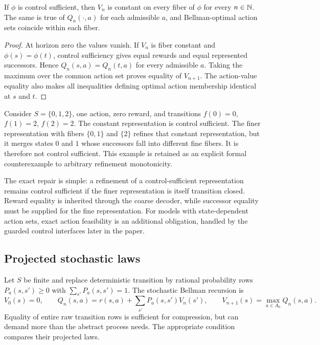 \begin{theorem}
If $\phi$ is control sufficient, then $V_n$ is constant on every fiber of $\phi$ for every $n\in\mathbb N$. The same is true of $Q_n(\cdot,a)$ for each admissible $a$, and Bellman-optimal action sets coincide within each fiber.
\end{theorem}
\begin{proof}
At horizon zero the values vanish. If $V_n$ is fiber constant and $\phi(s)=\phi(t)$, control sufficiency gives equal rewards and equal represented successors. Hence $Q_n(s,a)=Q_n(t,a)$ for every admissible $a$. Taking the maximum over the common action set proves equality of $V_{n+1}$. The action-value equality also makes all inequalities defining optimal action membership identical at $s$ and $t$.
\end{proof}

\begin{example}
Consider $S=\{0,1,2\}$, one action, zero reward, and transitions $f(0)=0$, $f(1)=2$, $f(2)=2$. The constant representation is control sufficient. The finer representation with fibers $\{0,1\}$ and $\{2\}$ refines that constant representation, but it merges states $0$ and $1$ whose successors fall into different fine fibers. It is therefore not control sufficient. This example is retained as an explicit formal counterexample to arbitrary refinement monotonicity.
\end{example}

The exact repair is simple: a refinement of a control-sufficient representation remains control sufficient if the finer representation is itself transition closed. Reward equality is inherited through the coarse decoder, while successor equality must be supplied for the fine representation. For models with state-dependent action sets, exact action feasibility is an additional obligation, handled by the guarded control interfaces later in the paper.

\subsection{Projected stochastic laws}

Let $S$ be finite and replace deterministic transition by rational probability rows $P_a(s,s')\ge0$ with $\sum_{s'}P_a(s,s')=1$. The stochastic Bellman recursion is
\[
 V_0(s)=0,\qquad Q_n(s,a)=r(s,a)+\sum_{s'}P_a(s,s')V_n(s'),\qquad
 V_{n+1}(s)=\max_{a\in A_0}Q_n(s,a).
\]
Equality of entire raw transition rows is sufficient for compression, but can demand more than the abstract process needs. The appropriate condition compares their projected laws.

